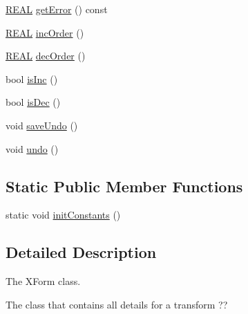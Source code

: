 \begin{DoxyCompactItemize}
\item 
\hyperlink{util_8h_a5821460e95a0800cf9f24c38915cbbde}{R\-E\-A\-L} \hyperlink{classCXForm_aa25c50b2811830ca8e54853a143e5dde}{get\-Error} () const 
\item 
\hyperlink{util_8h_a5821460e95a0800cf9f24c38915cbbde}{R\-E\-A\-L} \hyperlink{classCXForm_a094937703c2d67ef29f5c12fbc65b438}{inc\-Order} ()
\item 
\hyperlink{util_8h_a5821460e95a0800cf9f24c38915cbbde}{R\-E\-A\-L} \hyperlink{classCXForm_a903c633f1ac0756230bcd383e35a1d85}{dec\-Order} ()
\item 
bool \hyperlink{classCXForm_a9b085759beff4d834e56969eb01b7020}{is\-Inc} ()
\item 
bool \hyperlink{classCXForm_a14ededb4bf28f12d9f6525fa5758102d}{is\-Dec} ()
\item 
void \hyperlink{classCXForm_a706bcfdd32f029320524aaa7cbb1427e}{save\-Undo} ()
\item 
void \hyperlink{classCXForm_af7feb93ddf2cd2df187b35b565658d3d}{undo} ()
\end{DoxyCompactItemize}
\subsection*{Static Public Member Functions}
\begin{DoxyCompactItemize}
\item 
static void \hyperlink{classCXForm_a69329814cc3fdf98afabaebb57305886}{init\-Constants} ()
\end{DoxyCompactItemize}


\subsection{Detailed Description}
The X\-Form class. 

The class that contains all details for a transform ?? 

